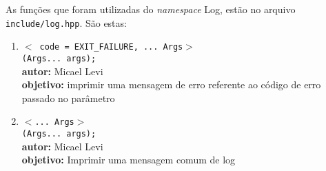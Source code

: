 As funções que foram utilizadas do \emph{namespace} Log, estão no arquivo \texttt{include/log.hpp}. São estas:
\begin{enumerate} %
\setlength\itemsep{1em}

\item \texttt{$<$ code = EXIT\_FAILURE, ... Args$>$ \\  (Args... args);} \\
    \noindent \textbf{autor:} Micael Levi \\
    \noindent \textbf{objetivo:} imprimir uma mensagem de erro referente ao código de erro passado no parâmetro
    
\item \texttt{$<$... Args$>$\\  (Args... args);} \\
    \noindent \textbf{autor:} Micael Levi \\
    \noindent \textbf{objetivo:} Imprimir uma mensagem comum de log

\end{enumerate}
